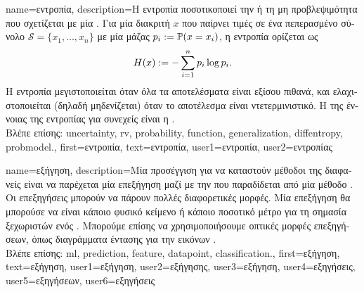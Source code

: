 {name={\foreignlanguage{greek}{εντροπία}},
	description={\foreignlanguage{greek}{Η εντροπία ποσοτικοποιεί την} 
		 \foreignlanguage{greek}{ή τη μη προβλεψιμότητα που σχετίζεται με μία} 
		 \cite{coverthomas}. 
		\foreignlanguage{greek}{Για μία διακριτή}  $x$ \foreignlanguage{greek}{που παίρνει 
		τιμές σε ένα πεπερασμένο σύνολο $\mathcal{S} = \{x_1, \ldots, x_n\}$ με μία} 
		\foreignlanguage{greek}{μάζας}  $p_i := \mathbb{P}({x = x_i})$, \foreignlanguage{greek}{η 
		εντροπία ορίζεται ως}
		\[
		H(x) := -\sum_{i=1}^n p_i \log p_i.
		\]
		\foreignlanguage{greek}{Η εντροπία μεγιστοποιείται όταν όλα τα αποτελέσματα είναι εξίσου πιθανά, 
		και ελαχιστοποιείται (δηλαδή μηδενίζεται) όταν το αποτέλεσμα είναι ντετερμινιστικό. Η} 
		 \foreignlanguage{greek}{της έννοιας της εντροπίας για συνεχείς} 
		 \foreignlanguage{greek}{είναι η} . \\
		\foreignlanguage{greek}{Βλέπε επίσης:} \gls{uncertainty}, \gls{rv}, \gls{probability}, \gls{function}, \gls{generalization}, 
		\gls{diffentropy}, \gls{probmodel}.},
	first={\foreignlanguage{greek}{εντροπία}},
	text={\foreignlanguage{greek}{εντροπία}},
	user1={\foreignlanguage{greek}{εντροπία}}, %
  	user2={\foreignlanguage{greek}{εντροπίας}} %
}

{name={\foreignlanguage{greek}{εξήγηση}},
	description={\foreignlanguage{greek}{Μία προσέγγιση για να καταστούν μέθοδοι της}   
		\foreignlanguage{greek}{διαφανείς είναι να παρέχεται μία επεξήγηση} 
		\foreignlanguage{greek}{μαζί με την}  \foreignlanguage{greek}{που παραδίδεται από μία μέθοδο}  
		. \foreignlanguage{greek}{Οι επεξηγήσεις μπο\-ρούν να πάρουν πολλές διαφορετικές μορφές. 
		Μία επεξήγηση θα μπορούσε να είναι κάποιο φυσικό κείμενο ή κάποιο ποσοτικό μέτρο για τη σημασία  
		ξεχωριστών}  \foreignlanguage{greek}{ενός}  \cite{Molnar2019}. 
		\foreignlanguage{greek}{Μπορούμε επίσης να χρησιμοποιήσουμε οπτικές μορφές επεξηγήσεων,  
		όπως διαγράμματα έντασης για την}  \foreignlanguage{greek}{εικόνων} \cite{GradCamPaper}.\\
		\foreignlanguage{greek}{Βλέπε επίσης:} \gls{ml}, \gls{prediction}, \gls{feature}, \gls{datapoint}, \gls{classification}.},
	first={\foreignlanguage{greek}{εξήγηση}},
	text={\foreignlanguage{greek}{εξήγηση}},
	user1={\foreignlanguage{greek}{εξήγηση}}, %
    	user2={\foreignlanguage{greek}{εξήγησης}}, %
	user3={\foreignlanguage{greek}{εξήγηση}}, %
    	user4={\foreignlanguage{greek}{εξηγήσεις}}, %
	user5={\foreignlanguage{greek}{εξηγήσεων}}, %
    	user6={\foreignlanguage{greek}{εξηγήσεις}} %
}

